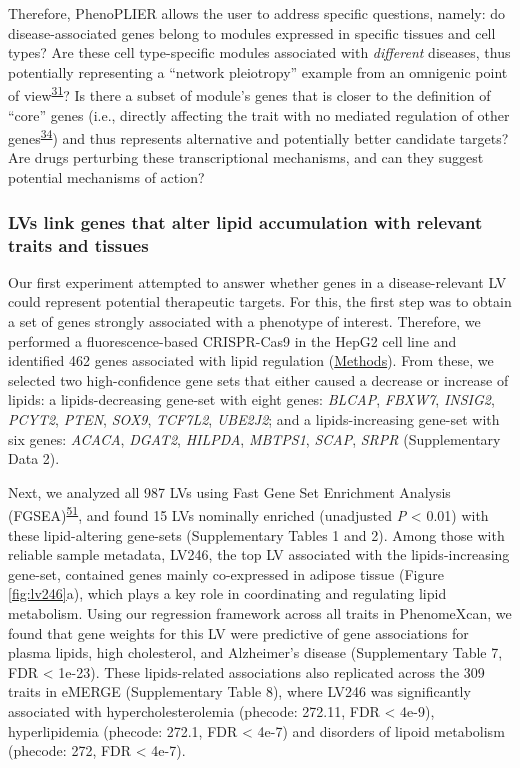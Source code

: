 \documentclass[
  a4paper,
]{article}
\begin{document}
Therefore, PhenoPLIER allows the user to address specific questions, namely:
do disease-associated genes belong to modules expressed in specific tissues and cell types?
Are these cell type-specific modules associated with \emph{different} diseases, thus potentially representing a ``network pleiotropy'' example from an omnigenic point of view\textsuperscript{\protect\hyperlink{ref-vpIDZCSa}{31}}?
Is there a subset of module's genes that is closer to the definition of ``core'' genes (i.e., directly affecting the trait with no mediated regulation of other genes\textsuperscript{\protect\hyperlink{ref-LXvTZzEA}{34}}) and thus represents alternative and potentially better candidate targets?
Are drugs perturbing these transcriptional mechanisms, and can they suggest potential mechanisms of action?

\hypertarget{lvs-link-genes-that-alter-lipid-accumulation-with-relevant-traits-and-tissues}{%
\subsubsection{LVs link genes that alter lipid accumulation with relevant traits and tissues}\label{lvs-link-genes-that-alter-lipid-accumulation-with-relevant-traits-and-tissues}}

Our first experiment attempted to answer whether genes in a disease-relevant LV could represent potential therapeutic targets.
For this, the first step was to obtain a set of genes strongly associated with a phenotype of interest.
Therefore, we performed a fluorescence-based CRISPR-Cas9 in the HepG2 cell line and identified 462 genes associated with lipid regulation (\protect\hyperlink{sec:methods:crispr}{Methods}).
From these, we selected two high-confidence gene sets that either caused a decrease or increase of lipids:
a lipids-decreasing gene-set with eight genes: \emph{BLCAP}, \emph{FBXW7}, \emph{INSIG2}, \emph{PCYT2}, \emph{PTEN}, \emph{SOX9}, \emph{TCF7L2}, \emph{UBE2J2};
and a lipids-increasing gene-set with six genes: \emph{ACACA}, \emph{DGAT2}, \emph{HILPDA}, \emph{MBTPS1}, \emph{SCAP}, \emph{SRPR} (Supplementary Data 2).

Next, we analyzed all 987 LVs using Fast Gene Set Enrichment Analysis (FGSEA)\textsuperscript{\protect\hyperlink{ref-Z8WXLD67}{51}}, and found 15 LVs nominally enriched (unadjusted \emph{P} \textless{} 0.01) with these lipid-altering gene-sets (Supplementary Tables 1 and 2).
Among those with reliable sample metadata, LV246, the top LV associated with the lipids-increasing gene-set, contained genes mainly co-expressed in adipose tissue (Figure \ref{fig:lv246}a), which plays a key role in coordinating and regulating lipid metabolism.
Using our regression framework across all traits in PhenomeXcan, we found that gene weights for this LV were predictive of gene associations for plasma lipids, high cholesterol, and Alzheimer's disease (Supplementary Table 7, FDR \textless{} 1e-23).
These lipids-related associations also replicated across the 309 traits in eMERGE (Supplementary Table 8), where LV246 was significantly associated with hypercholesterolemia (phecode: 272.11, FDR \textless{} 4e-9), hyperlipidemia (phecode: 272.1, FDR \textless{} 4e-7) and disorders of lipoid metabolism (phecode: 272, FDR \textless{} 4e-7).
\end{document}
